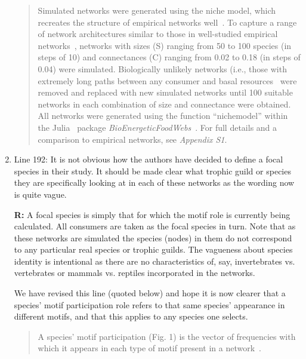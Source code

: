 \documentclass[12pt]{article}
\begin{document}
\begin{enumerate}
                \begin{quotation}
                Simulated networks were generated using the niche model, which recreates the structure of empirical networks well~\citep{Williams2000,Stouffer2007}.
                To capture a range of network architectures similar to those in well-studied empirical networks~\citep{Dunne2002,Dunne2002e}, networks with sizes (S) ranging from 50 to 100 species (in steps of 10) and connectances (C) ranging from 0.02 to 0.18 (in steps of 0.04) were simulated. 
                Biologically unlikely networks (i.e., those with extremely long paths between any consumer and basal resources~\citep{Borrelli2014} were removed and replaced with new simulated networks until 100 suitable networks in each combination of size and connectance were obtained.
                All networks were generated using the function ``nichemodel'' within the Julia~\citep{Bezanson2017julia} package \emph{BioEnergeticFoodWebs}~\citep{bioenergfw,Delmas2017}.     
                For full details and a comparison to empirical networks, see \emph{Appendix S1}.
                \end{quotation}


            \item Line 192: It is not obvious how the authors have decided to define a focal species in their study. It should be made clear what trophic guild or species they are specifically looking at in each of these networks as the wording now is quite vague.

                \textbf{R:} A focal species is simply that for which the motif role is currently being calculated. All consumers are taken as the focal species in turn. Note that as these networks are simulated the species (nodes) in them do not correspond to any particular real species or trophic guilds. The vagueness about species identity is intentional as there are no characteristics of, say, invertebrates vs. vertebrates or mammals vs. reptiles incorporated in the networks. 

                We have revised this line (quoted below) and hope it is now clearer that a species' motif participation role refers to that same species' appearance in different motifs, and that this applies to any species one selects.
                \begin{quotation}
                A species' motif participation (Fig. 1) is the vector of frequencies with which it appears in each type of motif present in a network~\citep{Stouffer2012}.
                \end{quotation}



\end{enumerate}
\end{document}
